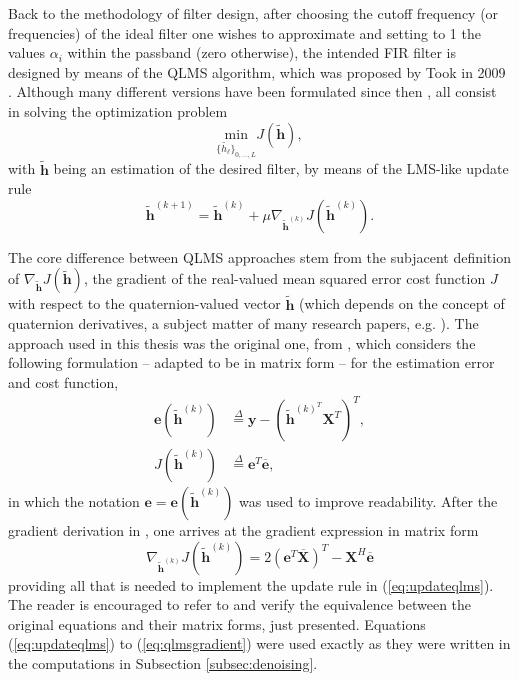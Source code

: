 Back to the methodology of filter design, after choosing the cutoff frequency (or frequencies) of the ideal filter one wishes to approximate and setting to 1 the values $\alpha_i$ within the passband (zero otherwise),
the intended FIR filter is designed by means of the QLMS algorithm, which was proposed by Took in 2009 \cite{took2008quaternion}. Although many different versions have been formulated since then \cite{ogunfunmi2015adaptive, almeida2014low, ortolani2016quaternion}, all consist in solving the optimization problem
\begin{equation}
    \label{eq:opt}
    \underset{\{\widetilde{h_\ell}\}_{0, \dots, L}}{\text{min}} J(\mathbf{\widetilde{h}}),
\end{equation}
with $\mathbf{\widetilde{h}}$ being an estimation of the desired filter, by means of the LMS-like update rule
\begin{equation}
    \label{eq:updateqlms}
    \mathbf{\widetilde{h}}^{(k+1)} =
    \mathbf{\widetilde{h}}^{(k)} +
    \mu \nabla_{\mathbf{\widetilde{h}}^{(k)}} J(\mathbf{\widetilde{h}}^{(k)}).
\end{equation}

The core difference between QLMS approaches stem from the subjacent definition of $\nabla_{\mathbf{\widetilde{h}}} J(\mathbf{\widetilde{h}})$, the gradient of the real-valued mean squared error cost function $J$ with respect to the quaternion-valued vector $\mathbf{\widetilde{h}}$ (which depends on the concept of quaternion derivatives, a subject matter of many research papers, e.g. \cite{xu2015enabling,jahanchahi2012gradient}). The approach used in this thesis was the original one, from \cite{took2008quaternion}, which considers the following formulation -- adapted to be in matrix form -- for the estimation error and cost function,
\begin{align}
    \label{eq:errorqlms}
    \mathbf{e}(\mathbf{\widetilde{h}}^{(k)}) & \overset{\Delta}{=}
    \mathbf{y} -
    \left( \mathbf{\widetilde{h}}^{{(k)}^T} \mathbf{X}^T \right)^T, \\
    J(\mathbf{\widetilde{h}}^{(k)})          & \overset{\Delta}{=}
    \mathbf{e}^T
    \overline{\mathbf{e}},
\end{align}
in which the notation $\mathbf{e} = \mathbf{e}(\mathbf{\widetilde{h}}^{(k)})$ was used to improve readability. After the gradient derivation in \cite{took2008quaternion}, one arrives at the gradient expression in matrix form
\begin{equation}
    \label{eq:qlmsgradient}
    \nabla_{\mathbf{\widetilde{h}}^{(k)}} J(\mathbf{\widetilde{h}}^{(k)}) =
    2 \left(
    \mathbf{e}^T \overline{\mathbf{X}}
    \right)^T - \mathbf{X}^H \overline{\mathbf{e}}
\end{equation}
providing all that is needed to implement the update rule in (\ref{eq:updateqlms}). The reader is encouraged to refer to \cite{took2008quaternion} and verify the equivalence between the original equations and their matrix forms, just presented. Equations (\ref{eq:updateqlms}) to (\ref{eq:qlmsgradient}) were used exactly as they were written in the computations in Subsection \ref{subsec:denoising}.

